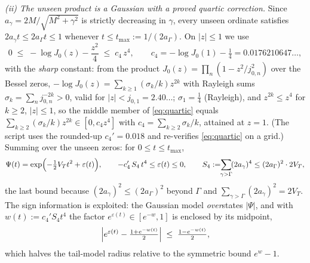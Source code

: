 \documentclass[11pt]{article}
\newcommand{\eps}{\varepsilon}
\begin{document}
\emph{(ii) The unseen product is a Gaussian with a proved quartic
correction.} Since $a_\gamma=2M/\sqrt{M^2+\gamma^2}$ is strictly
decreasing in $\gamma$, every unseen ordinate satisfies
$2a_\gamma t\le 2a_\Gamma t\le1$ whenever
$t\le t_{\max}:=1/(2a_\Gamma)$. On $|z|\le1$ we use
\begin{equation}\label{eq:quartic}
0\;\le\;-\log J_0(z)-\frac{z^2}{4}\;\le\;c_4\,z^4,
\qquad
c_4=-\log J_0(1)-\tfrac14=0.0176210647\ldots,
\end{equation}
with the \emph{sharp} constant: from the product
$J_0(z)=\prod_n(1-z^2/j_{0,n}^2)$ over the Bessel zeros,
$-\log J_0(z)=\sum_{k\ge1}(\sigma_k/k)z^{2k}$ with Rayleigh sums
$\sigma_k=\sum_nj_{0,n}^{-2k}>0$, valid for $|z|<j_{0,1}=2.40\ldots$;
$\sigma_1=\tfrac14$ (Rayleigh), and $z^{2k}\le z^4$ for $k\ge2$,
$|z|\le1$, so the middle member of \eqref{eq:quartic} equals
$\sum_{k\ge2}(\sigma_k/k)z^{2k}\in[0,c_4z^4]$ with
$c_4=\sum_{k\ge2}\sigma_k/k$, attained at $z=1$. (The script uses the
rounded-up $c_4'=0.018$ and re-verifies \eqref{eq:quartic} on a grid.)
Summing over the unseen zeros: for $0\le t\le t_{\max}$,
\[
\Psi(t)=\exp\Bigl(-\tfrac12V_Tt^2+\eps(t)\Bigr),
\qquad
-c_4'\,S_4\,t^4\le\eps(t)\le0,
\qquad
S_4:=\!\!\sum_{\gamma>\Gamma}\!(2a_\gamma)^4
\le(2a_\Gamma)^2\cdot 2V_T,
\]
the last bound because $(2a_\gamma)^2\le(2a_\Gamma)^2$ beyond $\Gamma$
and $\sum_{\gamma>\Gamma}(2a_\gamma)^2=2V_T$. The sign information is
exploited: the Gaussian model \emph{over}states $|\Psi|$, and with
$w(t):=c_4'S_4t^4$ the factor $e^{\eps(t)}\in[e^{-w},1]$ is enclosed by
its midpoint,
\[
\Bigl|e^{\eps(t)}-\tfrac{1+e^{-w(t)}}2\Bigr|\;\le\;\tfrac{1-e^{-w(t)}}2,
\]
which halves the tail-model radius relative to the symmetric bound
$e^{w}-1$.
\end{document}
